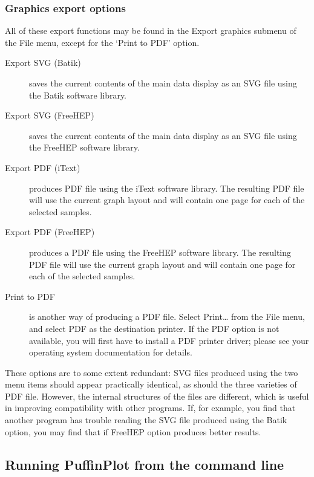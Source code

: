 \documentclass[a4paper,british]{article}
\newcommand{\ppcmd}[1]{\textsf{#1}} %
\newcommand{\caps}[1]{\MakeTextUppercase{#1}} %
\begin{document}
\subsubsection{Graphics export options}

All of these export functions may be found in the \ppcmd{Export graphics}
submenu of the \ppcmd{File} menu, except for the ‘Print to PDF’ option.

\begin{description}

\item[Export SVG (Batik)] saves the current contents of the main
  data display as an \caps{svg} file using the Batik software
  library.

\item[Export SVG (FreeHEP)] saves the current contents of the main
  data display as an \caps{svg} file using the FreeHEP software
  library.

\item[Export PDF (iText)] produces \caps{pdf} file using the iText software
  library. The resulting \caps{pdf} file will use the current graph layout
  and will contain one page for each of the selected samples.

\item[Export PDF (FreeHEP)] produces a \caps{pdf} file using the FreeHEP
  software library. The resulting \caps{pdf} file will use the current graph
  layout and will contain one page for each of the selected samples.

\item[Print to PDF] is another way of producing a PDF file. Select
  \ppcmd{Print\ldots} from the \ppcmd{File} menu, and select \ppcmd{PDF} as
  the destination printer. If the PDF option is not available, you will
  first have to install a PDF printer driver; please see your operating
  system documentation for details.

\end{description}

These options are to some extent redundant: SVG files produced using the two
menu items should appear practically identical, as should the three varieties
of PDF file. However, the internal structures of the files are different,
which is useful in improving compatibility with other programs. If, for
example, you find that another program has trouble reading the SVG file
produced using the Batik option, you may find that if FreeHEP option 
produces better results.

\subsection{\label{sec:command-line}Running PuffinPlot from the command line}
\end{document}
